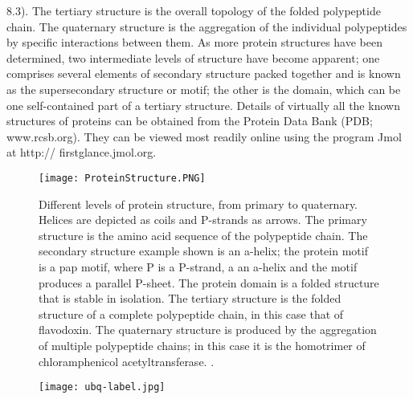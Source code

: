 8.3). The tertiary structure is the overall topology of the folded polypeptide chain. The quaternary
structure is the aggregation of the individual polypeptides by specific interactions between them.
As more protein structures have been determined, two intermediate levels of structure have become
apparent; one comprises several elements of secondary structure packed together and is known as the
supersecondary structure or motif; the other is the domain, which can be one self-contained part
of a tertiary structure.
Details of virtually all the known structures of proteins can be obtained from the Protein Data Bank
(PDB; www.rcsb.org). They can be viewed most readily online using the program Jmol at http://
firstglance.jmol.org.

\begin{figure}[h]
\centering
\begin{minipage}[t]{0.875\textwidth}
\centering
\texttt{[image: ProteinStructure.PNG]}

\caption{\small{Different levels of  protein structure, from primary to quaternary. Helices are depicted as coils and P-strands as arrows. The primary structure is the amino acid sequence of the polypeptide chain. The secondary structure example shown is an a-helix; the protein motif is  a pap motif, where P is a P-strand, a an a-helix and the motif produces a parallel P-sheet. The protein domain is a folded structure that is stable in isolation. The tertiary structure is the folded structure of a complete polypeptide chain, in this case that of flavodoxin. The quaternary structure is produced by the aggregation of multiple polypeptide chains; in this case it is the homotrimer of  chloramphenicol acetyltransferase. 
\cite{creighton2010biophysical}.}}

\label{fig:ubq}
\end{minipage} 
\end{figure}

\begin{figure}[h]
\centering
\begin{minipage}[t]{0.6\textwidth}
\centering
\texttt{[image: ubq-label.jpg]}

\caption{\small{}}

\label{fig:ProteinStructure}
\end{minipage} 
\end{figure}



